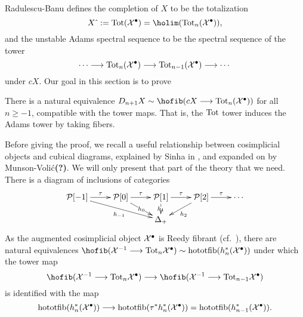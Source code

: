 \documentclass[11pt]{amsart}
\theoremstyle{plain}
\begin{document}
Radulescu-Banu defines the completion of $X$ to be the totalization
\[X\hat{\ }:=\textup{Tot}(\calX^\bullet)=\holim (\textup{Tot}_n(\calX^\bullet)),\]
and the unstable Adams spectral sequence to be the spectral sequence of the tower
\[\cdots \longrightarrow\textup{Tot}_n(\mathcal{X}^\bullet)\longrightarrow \textup{Tot}_{n-1}(\mathcal{X}^\bullet)\longrightarrow\cdots \]
under $cX$. Our goal in this section is to prove
\begin{prop}\label{towerIdentification}
There is a natural equivalence  $D_{n+1}X\sim\hofib(cX\to\textup{Tot}_{n}(\calX^\bullet))$ for all $n\geq-1$, compatible with the tower maps. That is, the $\textup{Tot}$ tower induces the Adams tower by taking fibers.
\end{prop}
Before giving the proof, we recall a useful relationship between cosimplicial objects and cubical diagrams, explained by Sinha in \cite[Theorem 6.5]{SinhaSpacesOfKnots.pdf}, and expanded on by Munson-Voli\'c\textbf{(?)}.
We will only present that part of the theory that we need. There is a diagram of inclusions of categories
\[\xymatrix@R=4mm{
\calP[-1]\ar[r]^-{\tau}\ar_-{h_{-1}}[drr]
&%
\calP[0]\ar[r]^-{\tau}\ar|-{h_{0}}[dr]
&%
\calP[1]\ar[r]^-{\tau}\ar|-{h_{1}}[d]
&%
\calP[2]\ar[r]^-{\tau}\ar^-{h_{2}}[dl]
&%
\cdots \\
&&\Delta_+
}\]
As the augmented cosimplicial object $\mathcal{X}^\bullet$ is Reedy fibrant (cf.\ \cite[{X.4.9}]{YellowMonster}), there are natural equivalences $\hofib(\calX^{-1}\to\textup{Tot}_n\calX^\bullet)\sim \textup{hototfib}(h_n^*(\calX^\bullet))$ under which the tower map 
\[\hofib(\calX^{-1}\to\textup{Tot}_n\calX^\bullet)\to \hofib(\calX^{-1}\to\textup{Tot}_{n-1}\calX^\bullet)\]
is identified with the map
\[\textup{hototfib}(h_n^*(\mathcal{X}^\bullet))\longrightarrow \textup{hototfib}(\tau^*h_n^*(\mathcal{X}^\bullet))=\textup{hototfib}(h_{n-1}^*(\mathcal{X}^\bullet)).\]
\end{document}
